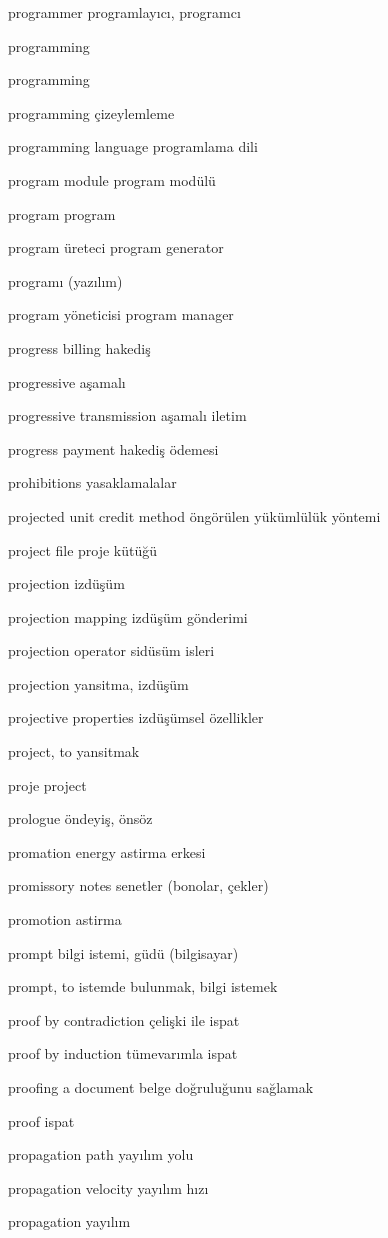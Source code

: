 \documentclass[12pt,fleqn]{article}\usepackage{../../common}
\begin{document}
programmer programlayıcı, programcı

programming

programming

programming çizeylemleme

programming language programlama dili

program module program modülü

program program

program üreteci program generator

programı (yazılım)

program yöneticisi program manager

progress billing hakediş

progressive aşamalı

progressive transmission aşamalı iletim

progress payment hakediş ödemesi

prohibitions yasaklamalalar

projected unit credit method öngörülen yükümlülük yöntemi

project file proje kütüğü

projection izdüşüm

projection mapping izdüşüm gönderimi

projection operator sidüsüm isleri

projection yansitma, izdüşüm

projective properties izdüşümsel özellikler

project, to yansitmak

proje project

prologue öndeyiş, önsöz

promation energy astirma erkesi

promissory notes senetler (bonolar, çekler)

promotion astirma

prompt bilgi istemi, güdü (bilgisayar)

prompt, to istemde bulunmak, bilgi istemek

proof by contradiction çelişki ile ispat

proof by induction tümevarımla ispat

proofing a document belge doğruluğunu sağlamak

proof ispat

propagation path yayılım yolu

propagation velocity yayılım hızı

propagation yayılım
\end{document}
